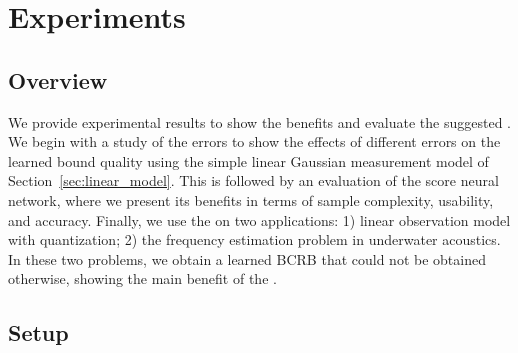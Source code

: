 \section{{Experiments}}\label{sec:experimental}
\subsection{{Overview}}
We provide experimental results to show the benefits and {evaluate} the suggested \name{}. 
We begin with a %
{study of the \name{} errors}  to show the effects of different errors on the learned bound quality using the simple linear Gaussian measurement model %
of Section~\ref{sec:linear_model}. This is followed by an {evaluation} of the \pe{} score neural network, where we present its benefits in terms of sample complexity, usability, and accuracy. Finally, we use the \name{} on two applications: 1) linear observation model with quantization; 2) the frequency estimation problem in underwater acoustics.  In these two problems, we obtain a learned BCRB that could not be obtained otherwise, showing the main benefit of the \name{}.    

\subsection{Setup}

%

